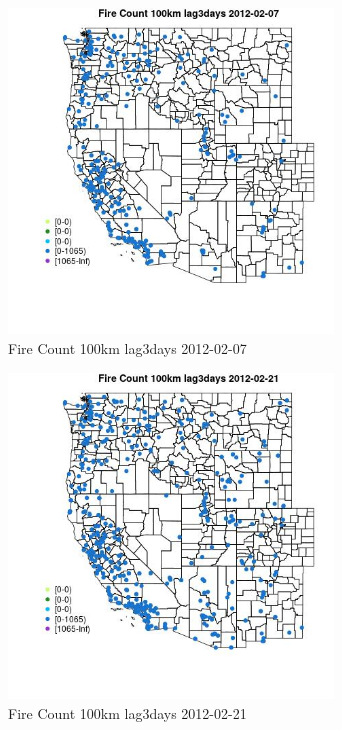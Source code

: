 \begin{figure} 
\centering  
\includegraphics[width=0.77\textwidth]{Code_Outputs/Report_ML_input_PM25_Step4_part_f_de_duplicated_aves_prioritize_24hr_obswNAs_MapObsFire_Count_100km_lag3days2012-02-07.jpg} 
\caption{\label{fig:Report_ML_input_PM25_Step4_part_f_de_duplicated_aves_prioritize_24hr_obswNAsMapObsFire_Count_100km_lag3days2012-02-07}Fire Count 100km lag3days 2012-02-07} 
\end{figure} 
 

\begin{figure} 
\centering  
\includegraphics[width=0.77\textwidth]{Code_Outputs/Report_ML_input_PM25_Step4_part_f_de_duplicated_aves_prioritize_24hr_obswNAs_MapObsFire_Count_100km_lag3days2012-02-21.jpg} 
\caption{\label{fig:Report_ML_input_PM25_Step4_part_f_de_duplicated_aves_prioritize_24hr_obswNAsMapObsFire_Count_100km_lag3days2012-02-21}Fire Count 100km lag3days 2012-02-21} 
\end{figure} 
 

